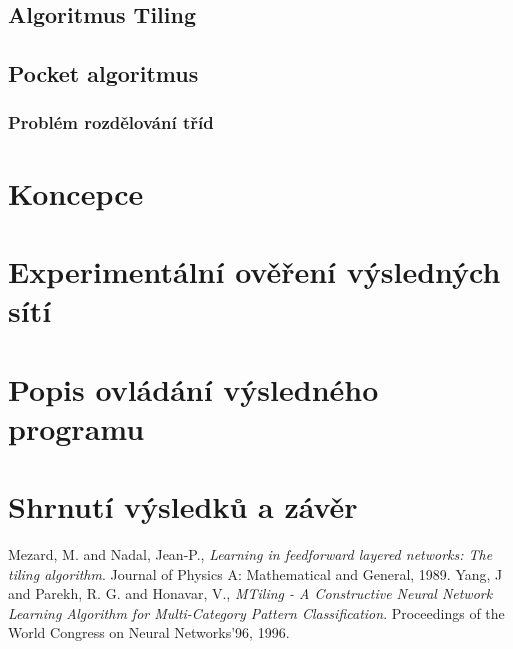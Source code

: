 \documentclass[a4paper, 11pt]{article}
\begin{document}
\subsection*{Algoritmus Tiling}
\subsection*{Pocket algoritmus}
\subsubsection*{Problém rozdělování tříd}
\section*{Koncepce}
\section*{Experimentální ověření výsledných sítí}
\section*{Popis ovládání výsledného programu}
\section*{Shrnutí výsledků a závěr}

\begin{thebibliography}{9}
  Mezard, M. and Nadal, Jean-P.,
  \emph{Learning in feedforward layered networks: The tiling algorithm}.
  Journal of Physics A: Mathematical and General,
  1989.
  Yang, J and  Parekh, R. G. and Honavar, V.,
  \emph{MTiling - A Constructive Neural Network Learning Algorithm for Multi-Category Pattern Classification}.
  Proceedings of the World Congress on Neural Networks'96,
  1996.
\end{thebibliography}
\end{document}
